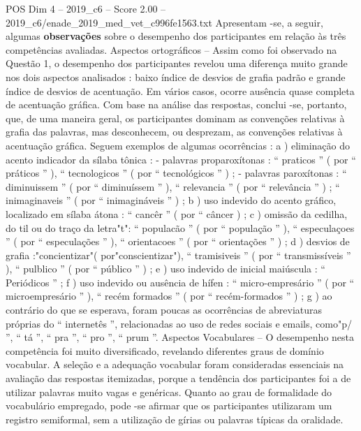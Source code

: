 \begin{textsample}{POS Dim 4 – 2019\_c6 – Score 2.00 – 2019\_c6/enade\_2019\_med\_vet\_c996fe1563.txt}
Apresentam -se, a seguir, algumas \textbf{observações} sobre o desempenho dos participantes em relação às três competências avaliadas.
Aspectos ortográficos – Assim como foi observado na Questão 1, o desempenho dos participantes revelou uma diferença muito grande nos dois aspectos analisados : baixo índice de desvios de grafia padrão e grande índice de desvios de acentuação.
Em vários casos, ocorre ausência quase completa de acentuação gráfica.
Com base na análise das respostas, conclui -se, portanto, que, de uma maneira geral, os participantes dominam as convenções relativas à grafia das palavras, mas desconhecem, ou desprezam, as convenções relativas à acentuação gráfica.
Seguem exemplos de algumas ocorrências : a ) eliminação do acento indicador da sílaba tônica : - palavras proparoxítonas : “ praticos ” ( por “ práticos ” ), “ tecnologicos ” ( por “ tecnológicos ” ) ; - palavras paroxítonas : “ diminuissem ” ( por “ diminuíssem ” ), “ relevancia ” ( por “ relevância ” ) ; “ inimaginaveis ” ( por “ inimagináveis ” ) ; b ) uso indevido do acento gráfico, localizado em sílaba átona : “ cancêr ” ( por “ câncer ) ; c ) omissão da cedilha, do til ou do traço da letra"t": “ populacão ” ( por “ população ” ), “ especulaçoes ” ( por “ especulações ” ), “ orientacoes ” ( por “ orientações ” ) ; d ) desvios de grafia :"concientizar"( por"conscientizar"), “ tramisiveis ” ( por “ transmissíveis ” ), “ pulblico ” ( por “ público ” ) ; e ) uso indevido de inicial maiúscula : “ Periódicos ” ; f ) uso indevido ou ausência de hífen : “ micro-empresário ” ( por “ microempresário ” ), “ recém formados ” ( por “ recém-formados ” ) ; g ) ao contrário do que se esperava, foram poucas as ocorrências de abreviaturas próprias do “ internetês ”, relacionadas ao uso de redes sociais e emails, como"p/ ”, “ tá ”, “ pra ”, “ pro ”, “ prum ”.
Aspectos Vocabulares – O desempenho nesta competência foi muito diversificado, revelando diferentes graus de domínio vocabular.
A seleção e a adequação vocabular foram consideradas essenciais na avaliação das respostas itemizadas, porque a tendência dos participantes foi a de utilizar palavras muito vagas e genéricas.
Quanto ao grau de formalidade do vocabulário empregado, pode -se afirmar que os participantes utilizaram um registro semiformal, sem a utilização de gírias ou palavras típicas da oralidade.

\end{textsample}
